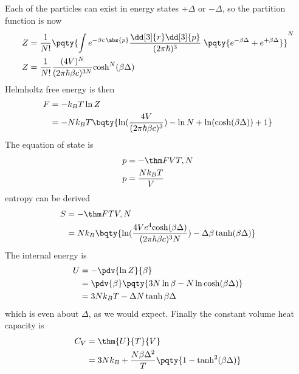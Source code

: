 \documentclass[12pt]{article}
\begin{document}
        \subsubsection{} Each of the particles can exist in energy states \( + \Delta \) or \( - \Delta \), so the partition function is now
        \begin{align*}
            Z &= \frac{1}{N!} \pqty{\int e^{ - \beta c\,  \abs{p}}\frac{\dd[3]{r} \dd[3]{p}}{(2\pi\hbar)^3}\; \pqty{e^{ - \beta \Delta } + e^{ +\beta \Delta }}}^N\\
            Z &= \frac{1}{N!} {\frac{(4V)^{N}}{( 2\pi\hbar\beta c)^{3N}}}{\cosh^N(\beta \Delta )}
        \end{align*}
        Helmholtz free energy is then \begin{align*}
            F &= - k_BT \ln Z\\
            &= - N k_BT \bqty{ \ln(\frac{4V}{( 2\pi \hbar\beta c)^3}) -\ln N  + \ln(\cosh(\beta \Delta )) + 1}
        \end{align*}
        The equation of state is \begin{align*}
            p &= -\thm FV{T,N}\\
            p &= \frac{Nk_BT}{V}
        \end{align*}
        entropy can be derived \begin{align*}
            S &= -\thm FT{V,N}\\
            &= Nk_B\bqty{ \ln(\frac{4V e^4{\cosh(\beta \Delta )}}{( 2\pi \hbar\beta c)^3N}) - \Delta\beta\tanh(\beta \Delta) }
        \end{align*}
        The internal energy is \begin{align*}
            U &= -\pdv{\ln Z}{\beta }\\
            &= \pdv{\beta } \pqty{3N\ln \beta - N\ln \cosh(\beta \Delta )}\\
            &= 3Nk_BT - \Delta N\tanh{\beta \Delta }
        \end{align*}
        which is even about \(\Delta \), as we would expect. Finally the constant volume heat capacity is \begin{align*}
            C_V &= \thm{U}{T}{V}\\
            &= 3Nk_B + \frac{N\beta \Delta^2}{T} \pqty{1 - \tanh^2(\beta \Delta )}
        \end{align*}
\end{document}
